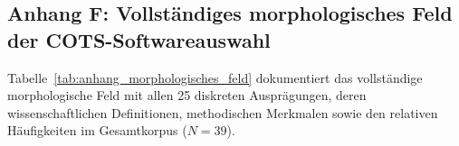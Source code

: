 \begin{landscape}
\newpage
\subsection*{Anhang F: Vollständiges morphologisches Feld der COTS-Softwareauswahl}
\label{subsec:anhang_morphologisches_feld}

Tabelle~\ref{tab:anhang_morphologisches_feld} dokumentiert das vollständige morphologische Feld mit allen 25 diskreten Ausprägungen, deren wissenschaftlichen Definitionen, methodischen Merkmalen sowie den relativen Häufigkeiten im Gesamtkorpus ($N = 39$).


\end{landscape}
